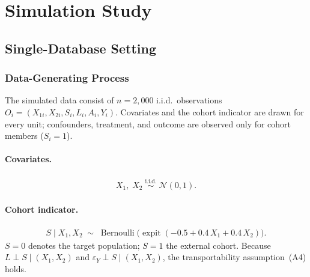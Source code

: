 
\section*{Simulation Study}

\subsection*{Single-Database Setting}

\subsubsection*{Data-Generating Process}

The simulated data consist of $n = 2{,}000$ i.i.d.\ observations
$O_i = (X_{1i}, X_{2i}, S_i, L_i, A_i, Y_i)$.
Covariates and the cohort indicator are drawn for every unit;
confounders, treatment, and outcome are observed only for cohort members
($S_i = 1$).

\paragraph{Covariates.}
\begin{align}
  X_1,\; X_2 \;\overset{\text{i.i.d.}}{\sim}\; \mathcal{N}(0,1).
\end{align}

\paragraph{Cohort indicator.}
\begin{align}
  S \mid X_1, X_2 \;\sim\; \operatorname{Bernoulli}\!\bigl(
    \operatorname{expit}(-0.5 + 0.4\,X_1 + 0.4\,X_2)\bigr).
\end{align}
$S = 0$ denotes the target population; $S = 1$ the external cohort.
Because $L \perp S \mid (X_1, X_2)$ and $\varepsilon_Y \perp S \mid (X_1,X_2)$,
the transportability assumption~(A4) holds.

